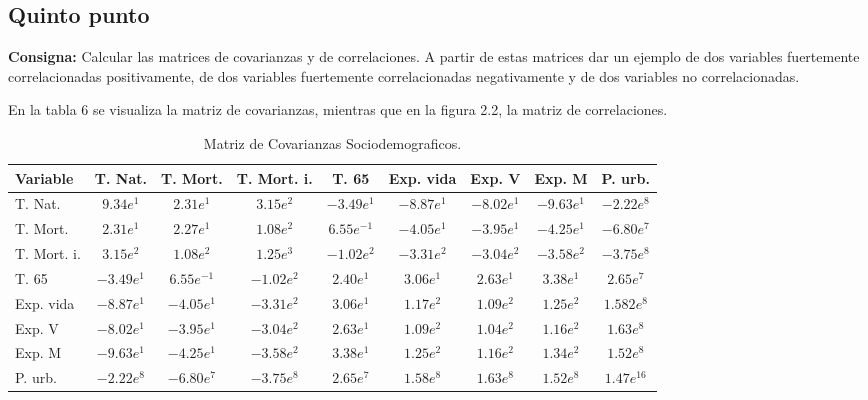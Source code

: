 \documentclass{article} %
\begin{document}
\subsection{Quinto punto}

\textbf{Consigna:} Calcular las matrices de covarianzas y de correlaciones. A partir de estas matrices dar un ejemplo de dos variables fuertemente correlacionadas positivamente, de dos variables fuertemente correlacionadas negativamente y de dos variables no correlacionadas.

En la tabla 6 se visualiza la matriz de covarianzas, mientras que en la figura 2.2, la matriz de correlaciones. 

\begin{table}[H]
	\centering
		\begin{tabular}{||l || c | c | c | c | c | c | c | c ||}
			\hline
			\hline
			Variable & T. Nat. & T. Mort. & T. Mort. i. & T. 65 & Exp. vida & Exp. V & Exp. M & P. urb.\\
			\hline			
			\hline
			T. Nat. & $9.34e^{1}$ & $2.31e^{1}$ & $3.15e^{2}$& $-3.49e^{1}$ & $-8.87e^{1}$ & $-8.02e^{1}$ & $-9.63e^{1}$ & $-2.22e^{8}$\\
			\hline
			T. Mort. & $2.31e^{1}$ & $2.27e^{1}$ & $1.08e^{2}$& $6.55e^{-1}$ & $-4.05e^{1}$ & $-3.95e^{1}$ & $-4.25e^{1}$ & $-6.80e^{7}$\\
			\hline
			T. Mort. i. & $3.15e^{2}$ & $1.08e^{2}$ & $1.25e^{3}$& $-1.02e^{2}$ & $-3.31e^{2}$ & $-3.04e^{2}$ & $-3.58e^{2}$ & $-3.75e^{8}$\\
			\hline
			T. 65 & $-3.49e^{1}$ & $6.55e^{-1}$ & $-1.02e^{2}$& $2.40e^{1}$ & $3.06e^{1}$ & $2.63e^{1}$ & $3.38e^{1}$ & $2.65e^{7}$\\
			\hline
			Exp. vida & $-8.87e^{1}$ & $-4.05e^{1}$ & $-3.31e^{2}$& $3.06e^{1}$ & $1.17e^{2}$ & $1.09e^{2}$ & $1.25e^{2}$ & $1.582e^{8}$\\
			\hline
			Exp. V & $-8.02e^{1}$ & $-3.95e^{1}$ & $-3.04e^{2}$& $2.63e^{1}$ & $1.09e^{2}$ & $1.04e^{2}$ & $1.16e^{2}$ & $1.63e^{8}$\\
			\hline
			Exp. M & $-9.63e^{1}$ & $-4.25e^{1}$ & $-3.58e^{2}$& $3.38e^{1}$ & $1.25e^{2}$ & $1.16e^{2}$ & $1.34e^{2}$ & $1.52e^{8}$\\
			\hline
			P. urb. & $-2.22e^{8}$ & $-6.80e^{7}$ & $-3.75e^{8}$& $2.65e^{7}$ & $1.58e^{8}$ & $1.63e^{8}$ & $1.52e^{8}$ & $1.47e^{16}$\\
			\hline
			\hline
		\end{tabular}
		\caption{Matriz de Covarianzas Sociodemograficos.}
			\label{tab:table-punto-2-5}
\end{table}
\end{document}
